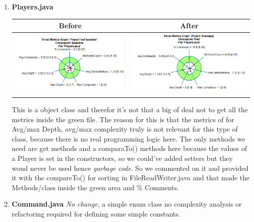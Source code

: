 \documentclass{article}
\begin{document}
\begin{enumerate}
	\item
	\textbf{Players.java\newline} %
	\begin{tabulary}{0.5\textwidth}{| c | c |}
	\hline
	Before & After \\ \hline
	\includegraphics[scale=0.4]{Playersjava-old.png} & \includegraphics[scale=0.4]{Playersjava-new.png} \\ \hline
	\end{tabulary}
	\newline
	\vspace{0.1cm}
	This is a object class and therefor it's not that a big of deal not to get all the metrics inside the
	green file. The reason for this is that the metrics of for Avg/max Depth, avg/max complexity truly is not relevant for this type of class, because there is no real programming logic here. The only methods we need are get methods and a comparaTo() methods here because the values of a Player is set in the constructors, so we could've added setters but they woud never be used hence \textit{garbage code}. So we commented on it and provided it with the compareTo() for sorting in FileReadWriter.java and that made the Methods/class inside the green area and \% Comments. 

	\item%
	\textbf{Command.java}
	\textit{No change}, a simple enum class no complexity analysis or refactoring 
	required for defining some simple constants. 

\end{enumerate}
\end{document}

